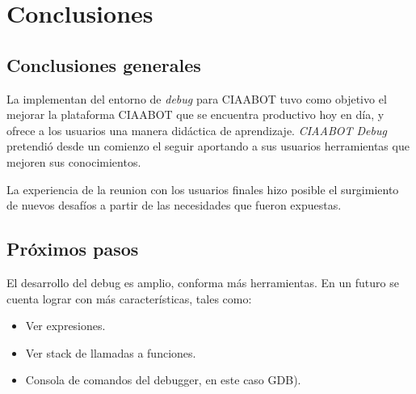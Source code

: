 
\chapter{Conclusiones} %

\label{Chapter5} %




\section{Conclusiones generales }


La implementan del entorno de \emph{debug} para CIAABOT tuvo como objetivo el mejorar la plataforma CIAABOT que se encuentra productivo hoy en día, y ofrece a los usuarios una manera didáctica de aprendizaje. \emph{CIAABOT Debug} pretendió desde un comienzo el seguir aportando a sus usuarios herramientas que mejoren sus conocimientos.

La experiencia de la reunion con los usuarios finales hizo posible el surgimiento de nuevos desafíos a partir de las necesidades que fueron expuestas.

 

\section{Próximos pasos}

El desarrollo del debug es amplio, conforma más herramientas. En un futuro se cuenta 
lograr con más características, tales como: 

\begin{itemize}
	\item Ver expresiones.
	\item Ver stack de llamadas a funciones.
	\item Consola de comandos del debugger, en este caso GDB).
\end{itemize}
